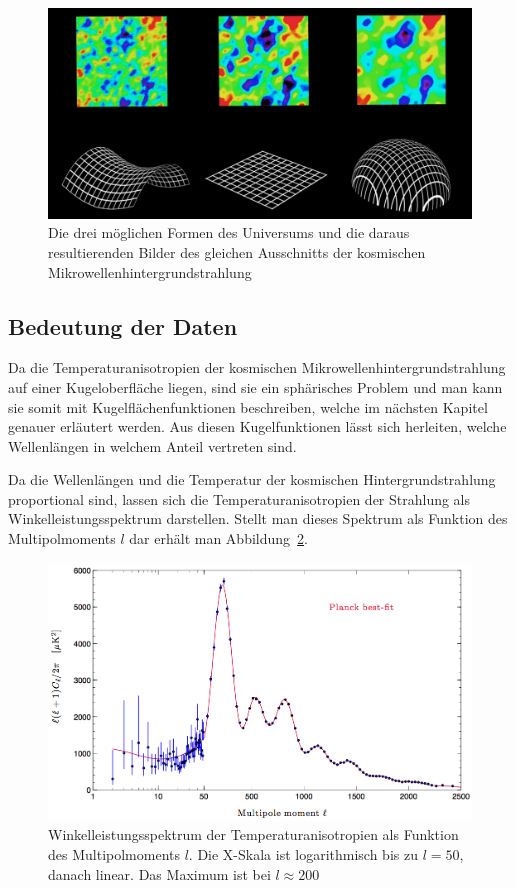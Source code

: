 \begin{figure}
	\centering
	\includegraphics[width=\linewidth]{cmb/images/universe_shapes.jpg}
	\caption{Die drei möglichen Formen des Universums und die daraus 
		resultierenden Bilder des gleichen Ausschnitts der kosmischen
		Mikrowellenhintergrundstrahlung}
	\label{fig:universe_shapes}
\end{figure}

\subsection{Bedeutung der Daten\label{subsec:cmb:data-meaning}}
Da die Temperaturanisotropien der kosmischen Mikrowellenhintergrundstrahlung auf einer
Kugeloberfläche liegen, sind sie ein sphärisches Problem und man kann sie somit mit 
Kugelflächenfunktionen beschreiben, welche im nächsten Kapitel genauer erläutert werden.
Aus diesen Kugelfunktionen lässt sich herleiten, welche Wellenlängen in welchem Anteil vertreten sind.

Da die Wellenlängen und die Temperatur der kosmischen Hintergrundstrahlung proportional sind, lassen sich die Temperaturanisotropien der Strahlung als Winkelleistungsspektrum darstellen.
Stellt man dieses Spektrum als Funktion des Multipolmoments $l$ dar erhält man 
Abbildung~\ref{fig:planck_spectrum}.

\begin{figure}
	\centering
	\includegraphics[width=\linewidth]{cmb/images/mission_spectrum.png}
	\caption{Winkelleistungsspektrum der Temperaturanisotropien als Funktion 
	des Multipolmoments $l$.
	Die X-Skala ist logarithmisch bis zu $l = 50$, danach linear. Das Maximum 
	ist bei $l \approx 200$}
	\label{fig:planck_spectrum}
\end{figure}

